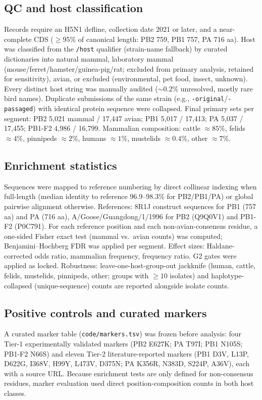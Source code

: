 \documentclass[11pt]{article}
\begin{document}
\subsection{QC and host classification}
Records require an H5N1 defline, collection date 2021 or later, and a near-complete CDS ($\geq95\%$ of canonical length: PB2 759, PB1 757, PA 716 aa). Host was classified from the \texttt{/host} qualifier (strain-name fallback) by curated dictionaries into natural mammal, laboratory mammal (mouse/ferret/hamster/guinea-pig/rat; excluded from primary analysis, retained for sensitivity), avian, or excluded (environmental, pet food, insect, unknown). Every distinct host string was manually audited ($\sim$0.2\% unresolved, mostly rare bird names). Duplicate submissions of the same strain (e.g., \texttt{-original}/\texttt{-passaged}) with identical protein sequence were collapsed. Final primary sets per segment: PB2 5,021 mammal / 17,447 avian; PB1 5,017 / 17,413; PA 5,037 / 17,455; PB1-F2 4,986 / 16,799. Mammalian composition: cattle $\approx85\%$, felids $\approx4\%$, pinnipeds $\approx2\%$, humans $\approx1\%$, mustelids $\approx0.4\%$, other $\approx7\%$.
\subsection{Enrichment statistics}
Sequences were mapped to reference numbering by direct collinear indexing when full-length (median identity to reference 96.9--98.3\% for PB2/PB1/PA) or global pairwise alignment otherwise. References: 8R1J construct sequences for PB1 (757 aa) and PA (716 aa), A/Goose/Guangdong/1/1996 for PB2 (Q9Q0V1) and PB1-F2 (P0C791). For each reference position and each non-avian-consensus residue, a one-sided Fisher exact test (mammal vs.\ avian counts) was computed; Benjamini--Hochberg FDR was applied per segment. Effect sizes: Haldane-corrected odds ratio, mammalian frequency, frequency ratio. G2 gates were applied as locked. Robustness: leave-one-host-group-out jackknife (human, cattle, felids, mustelids, pinnipeds, other; groups with $\geq10$ isolates) and haplotype-collapsed (unique-sequence) counts are reported alongside isolate counts.
\subsection{Positive controls and curated markers}
A curated marker table (\texttt{code/markers.tsv}) was frozen before analysis: four Tier-1 experimentally validated markers (PB2 E627K; PA T97I; PB1 N105S; PB1-F2 N66S) and eleven Tier-2 literature-reported markers (PB1 D3V, L13P, D622G, I368V, H99Y, L473V, D375N; PA K356R, N383D, S224P, A36V), each with a source URL. Because enrichment tests are only defined for non-consensus residues, marker evaluation used direct position-composition counts in both host classes.
\end{document}
